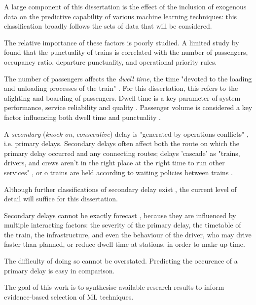\documentclass{article}
\begin{document}
A large component of this dissertation is the effect of the inclusion of exogenous data on the predictive capability of various machine learning techniques: this classification broadly follows the sets of data that will
be considered. 

The relative importance of these factors is poorly studied. A limited study by \cite{olsson_haugland_2004} found that the punctuality of trains is correlated with the number of passengers, occupancy ratio, departure punctuality, and operational priority rules.

The number of passengers affects the \textit{dwell time}, the time "devoted to the loading and unloading processes of the train" \cite{san_mohd_masirin_2016}. For this dissertation, this refers to the alighting
and boarding of passengers. Dwell time is a key parameter of system performance, service reliability and quality \cite{puong_2000}. Passenger volume is considered a key factor influencing both dwell time \cite{san_mohd_masirin_2016} and punctuality \cite{olsson_haugland_2004}.

A \textit{secondary} (\textit{knock-on}, \textit{consecutive}) delay is "generated by operations conflicts" \cite{cerreto_nielsen_harrod_nielsen_2016}, i.e. primary delays. Secondary delays often affect
both the route on which the primary delay occurred and any connecting routes; delays 'cascade' as "trains, drivers, and crews aren't in the right place at the right time to run other services" \cite{nr_knock_on_delays},
or o trains are held according to waiting policies between trains \cite{berger_et_al_2011}.

Although further classifications of secondary delay exist \cite{daamen_goverde_hansen_2008}, the current level of detail will suffice for this dissertation.

Secondary delays cannot be exactly forecast \cite{berger_et_al_2011}, \cite{milinkovic_markovic_veskovic_ivic_pavlovic_2013} because they are influenced by multiple interacting factors: the severity of the primary delay, the timetable of the train, the infrastructure, and even the behaviour of the driver, who may drive faster than planned, or reduce dwell time at stations, in order to make up time.

The difficulty of doing so cannot be overstated. Predicting the occurence of a primary delay is easy in comparison.

The goal of this work is to synthesise available research results to inform evidence-based selection of ML techniques.
\end{document}

